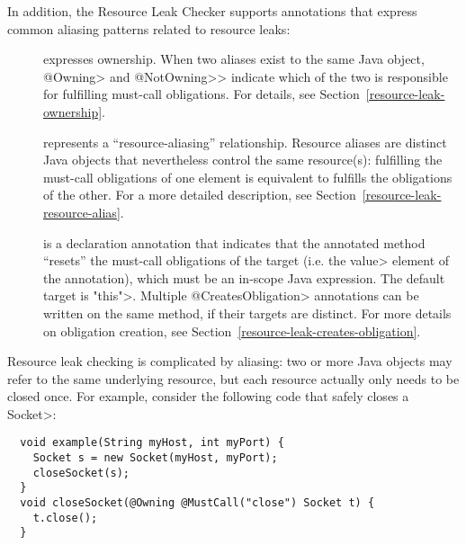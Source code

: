In addition, the Resource Leak Checker supports annotations that express common
aliasing patterns related to resource leaks:

\begin{description}

\item[]
\item[]
  expresses ownership.  When two aliases exist to the same Java object,
  \<@Owning> and \<@NotOwning>> indicate which of the two is responsible for
  fulfilling must-call obligations.  For details, see
  Section~\ref{resource-leak-ownership}.

\item[]
  represents a ``resource-aliasing'' relationship.  Resource aliases are
  distinct Java objects that nevertheless control the same resource(s):
  fulfilling the must-call obligations of one element is equivalent to
  fulfills the obligations of the other.  For a more detailed description,
  see Section~\ref{resource-leak-resource-alias}.

\item[]
  is a declaration annotation that indicates that the annotated method ``resets'' the must-call
  obligations of the target (i.e. the \<value> element of the annotation), which must
  be an in-scope Java expression. The default target is \<"this">. Multiple \<@CreatesObligation>
  annotations can be written on the same method, if their targets are distinct. For more details
  on obligation creation, see Section~\ref{resource-leak-creates-obligation}.

\end{description}



Resource leak checking is complicated by aliasing: two or more Java
objects may refer to the same underlying resource, but each resource
actually only needs to be closed once.
For example, consider the following code that safely closes a \<Socket>:

\begin{verbatim}
  void example(String myHost, int myPort) {
    Socket s = new Socket(myHost, myPort);
    closeSocket(s);
  }
  void closeSocket(@Owning @MustCall("close") Socket t) {
    t.close();
  }
\end{verbatim}

